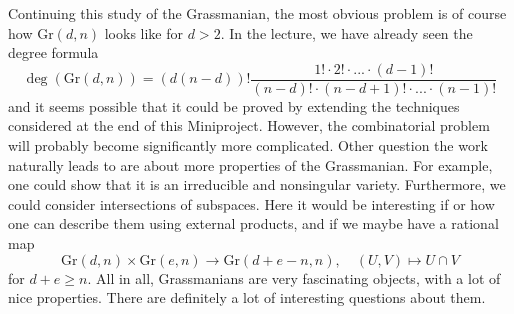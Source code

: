\documentclass{scrartcl}
\newcommand{\Gr}{\mathrm{Gr}}
\theoremstyle{definition}
\begin{document}
Continuing this study of the Grassmanian, the most obvious problem is of course how $\Gr(d, n)$ looks like for $d > 2$.
In the lecture, we have already seen the degree formula
\begin{equation*}
    \deg(\Gr(d, n)) = (d(n - d))! \frac {1! \cdot 2! \cdot ... \cdot (d - 1)!} {(n - d)! \cdot (n - d + 1)! \cdot ... \cdot (n - 1)!}
\end{equation*}
and it seems possible that it could be proved by extending the techniques considered at the end of this Miniproject.
However, the combinatorial problem will probably become significantly more complicated.
Other question the work naturally leads to are about more properties of the Grassmanian.
For example, one could show that it is an irreducible and nonsingular variety.
Furthermore, we could consider intersections of subspaces.
Here it would be interesting if or how one can describe them using external products, and if we maybe have a rational map
\begin{equation*}
    \Gr(d, n) \times \Gr(e, n) \to \Gr(d + e - n, n), \quad (U, V) \mapsto U \cap V
\end{equation*}
for $d + e \geq n$.
All in all, Grassmanians are very fascinating objects, with a lot of nice properties.
There are definitely a lot of interesting questions about them.

\printbibliography
\end{document}
